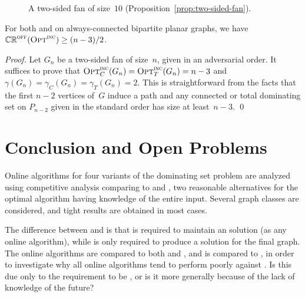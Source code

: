 \begin{figure}[!htb]
\begin{center}
\caption{A two-sided fan of size~$10$ (Proposition~\ref{prop:two-sided-fan}).
\label{fig:rotor}}
\end{center}
\end{figure}

\begin{proposition}
\label{prop:two-sided-fan}
For both \cds and \tds
on always-connected bipartite planar graphs, we have
$\mathbb{CR}^{\textsc{off}}(\operatorname{\textsc{Opt}}^\textsc{\ensuremath{\text{inc}}}) \ge (n-3)/2$.
\end{proposition}
\begin{proof}
Let $G_n$ be a two-sided fan of size~$n$, given in an adversarial order.
It suffices to prove that
$\operatorname{\textsc{Opt}}^\textsc{\ensuremath{\text{inc}}}_C(G_n) = \operatorname{\textsc{Opt}}^\textsc{\ensuremath{\text{inc}}}_T(G_n) = n-3$
and $\gamma(G_n) = \gamma_C(G_n) = \gamma_T(G_n) = 2$.
This is straightforward from the facts that the first $n-2$ vertices of~$G$
induce a path and any \incr connected or total dominating set on
$P_{n-2}$ given in the standard order has size at least~$n-3$.
\qed\end{proof}


\section{Conclusion and Open Problems}
Online algorithms for four variants of the dominating set problem
are analyzed using competitive analysis comparing to \onopt{} and \offopt{},
two reasonable alternatives for the optimal algorithm having
knowledge of the entire input.
Several graph classes are considered, and tight results are 
obtained in most cases.

The difference between \onopt and \offopt is that \onopt is
required to maintain an \incr solution (as any online algorithm),
while \offopt is only
required to produce a solution for the final graph.
The online algorithms are compared to both \onopt and \offopt,
and \onopt is compared to \offopt, in order to investigate
why all online algorithms tend to perform poorly against \offopt. 
Is this due only to the requirement to be \incr,
or is it more generally because of the lack of knowledge of the future?

